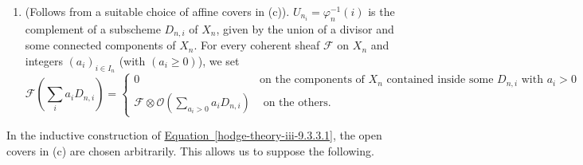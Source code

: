 \begin{enumerate}
      
 \item[(e)]
        (Follows from a suitable choice of affine covers in (c)).
        \(U_{n_i}=\varphi _n^{-1}(i)\) is the complement of a subscheme \(D_{n,i}\) of \(X_n\), given by the union of a divisor and some connected components of \(X_n\).
        For every coherent sheaf \(\mathscr {F}\) on \(X_n\) and integers \((a_i)_{i\in  I_n}\) (with \((a_i\geqslant 0)\)), we set
        \[           \mathscr {F}(\textstyle \sum _i a_i D_{n,i})           =           \begin {cases}             0             &\text {on the components of }X_n\text { contained inside some }D_{n,i}\text { with }a_i>0           \\\mathscr {F}\otimes \mathcal {O}(\sum _{a_i>0}a_i D_{n,i})             &\text { on the others}.           \end {cases}         \]
      

    \end{enumerate}\par{}In the inductive construction of \hyperref[hodge-theory-iii-9.3.3.1]{Equation~\ref*{hodge-theory-iii-9.3.3.1}}, the open covers in (c) are chosen arbitrarily.
    This allows us to suppose the following.

